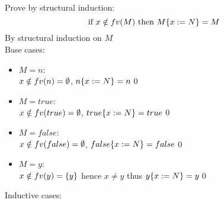 \subsection{}

Prove by structural induction:
\[
	\text{if }x \notin fv(M)\text{ then }M\{x:=N\} = M
\]
By structural induction on $M$\\
Base cases:
\begin{itemize}
	\item $M = n$:\\
	      $x \notin fv(n) = \emptyset$, $n\{x:=N\} = n$\qed
	\item $M = true$:\\
	      $x \notin fv(true)= \emptyset$, $true\{x:=N\} = true$\qed
	\item $M = false$:\\
	      $x \notin fv(false)= \emptyset$, $false\{x:=N\} = false$\qed
	\item $M = y$:\\
	      $x \notin fv(y)= \{y\}$ hence $x \ne y$ thus $y\{x:=N\} = y$\qed
\end{itemize}
Inductive cases:
